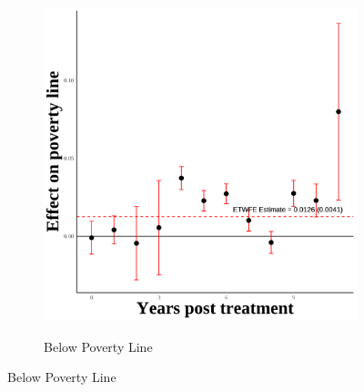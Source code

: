 \documentclass[12pt,english]{article}
\begin{document}
\begin{figure}[H]
\begin{subfigure}[b]{0.3\textwidth}
    \label{fig:snap-second}
  \end{subfigure}
  \hfill
  \begin{subfigure}[b]{0.3\textwidth}
    \centering
    \caption{Below Poverty Line}
    \includegraphics[width=\linewidth]{figures/plot23-poverty_line_event_study-second.png}
    \label{fig:poverty-line-second}
  \end{subfigure}

  \vspace{0.3cm} %


\end{figure}
\end{document}
